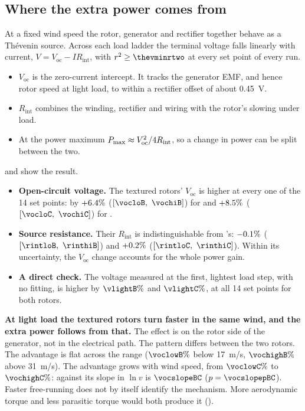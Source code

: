 \documentclass[11pt]{article}
\begin{document}
\subsection{Where the extra power comes from}\label{sec:thevenin}
At a fixed wind speed the rotor, generator and rectifier together behave as a Thévenin
source. Across each load ladder the terminal voltage falls linearly with current,
$V = V_\mathrm{oc} - I R_\mathrm{int}$, with $r^2\ge\thevminrtwo$ at every set point of every run.
\begin{itemize}
  \item $V_\mathrm{oc}$ is the zero-current intercept. It tracks the generator EMF, and hence rotor
        speed at light load, to within a rectifier offset of about \SI{0.45}{V}.
  \item $R_\mathrm{int}$ combines the winding, rectifier and wiring with the rotor's slowing under
        load.
  \item At the power maximum $P_{\max} \approx V_\mathrm{oc}^2/4R_\mathrm{int}$, so a change in power can be
        split between the two.
\end{itemize}

 and  show the result.
\begin{itemize}
  \item \textbf{Open-circuit voltage.} The textured rotors' $V_\mathrm{oc}$ is higher at every one
        of the 14 set points: by $+6.4\%$ ($[\vocloB,\ \vochiB]$) for  and $+8.5\%$
        ($[\vocloC,\ \vochiC]$) for .
  \item \textbf{Source resistance.} Their $R_\mathrm{int}$ is indistinguishable from 's:
        $-0.1\%$ ($[\rintloB,\ \rinthiB]$) and $+0.2\%$ ($[\rintloC,\ \rinthiC]$).
        Within its uncertainty, the $V_\mathrm{oc}$ change accounts for the whole power gain.
  \item \textbf{A direct check.} The voltage measured at the first, lightest load step, with no
        fitting, is higher by $\vlightB\%$ and $\vlightC\%$, at all 14 set points for both
        rotors.
\end{itemize}

\textbf{At light load the textured rotors turn faster in the same wind, and the extra power
follows from that.} The effect is on the rotor side of the generator, not in the electrical
path. The pattern differs between the two rotors. The  advantage is flat across the
range ($\voclowB\%$ below \SI{17}{m/s}, $\vochighB\%$ above \SI{31}{m/s}). The  advantage
grows with wind speed, from $\voclowC\%$ to $\vochighC\%$: against  its slope in $\ln v$
is $\vocslopeBC$ ($p=\vocslopepBC$). Faster free-running does not by itself identify the
mechanism. More aerodynamic torque and less parasitic torque would both produce it
().
\end{document}
